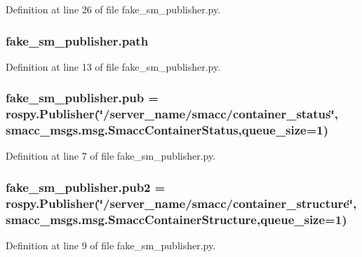 Definition at line 26 of file fake\+\_\+sm\+\_\+publisher.\+py.

\subsubsection[{\texorpdfstring{path}{path}}]{\setlength{\rightskip}{0pt plus 5cm}fake\+\_\+sm\+\_\+publisher.\+path}\hypertarget{namespacefake__sm__publisher_a6f260d72b657ebefffdec39c1fe6c012}{}\label{namespacefake__sm__publisher_a6f260d72b657ebefffdec39c1fe6c012}


Definition at line 13 of file fake\+\_\+sm\+\_\+publisher.\+py.

\subsubsection[{\texorpdfstring{pub}{pub}}]{\setlength{\rightskip}{0pt plus 5cm}fake\+\_\+sm\+\_\+publisher.\+pub = rospy.\+Publisher(\char`\"{}/server\+\_\+name/smacc/container\+\_\+status\char`\"{}, smacc\+\_\+msgs.\+msg.\+Smacc\+Container\+Status,queue\+\_\+size=1)}\hypertarget{namespacefake__sm__publisher_a6d0a08eb0afa31b5b359db0f14543ef0}{}\label{namespacefake__sm__publisher_a6d0a08eb0afa31b5b359db0f14543ef0}


Definition at line 7 of file fake\+\_\+sm\+\_\+publisher.\+py.

\subsubsection[{\texorpdfstring{pub2}{pub2}}]{\setlength{\rightskip}{0pt plus 5cm}fake\+\_\+sm\+\_\+publisher.\+pub2 = rospy.\+Publisher(\char`\"{}/server\+\_\+name/smacc/container\+\_\+structure\char`\"{}, smacc\+\_\+msgs.\+msg.\+Smacc\+Container\+Structure,queue\+\_\+size=1)}\hypertarget{namespacefake__sm__publisher_ab0e2b6ebc8e615492c4c8d7e5d6d2338}{}\label{namespacefake__sm__publisher_ab0e2b6ebc8e615492c4c8d7e5d6d2338}


Definition at line 9 of file fake\+\_\+sm\+\_\+publisher.\+py.

